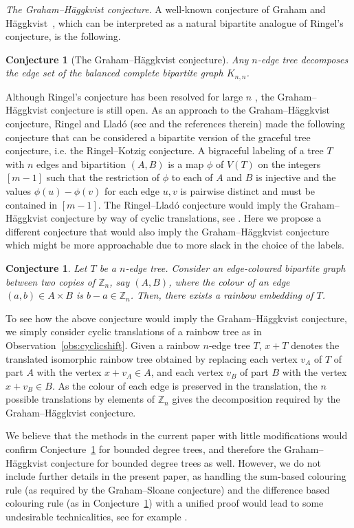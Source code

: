 \documentclass[a4paper,11pt,hidelinks]{amsart}
\newtheorem{conjecture}[theorem]{Conjecture}
\theoremstyle{definition}
\begin{document}
\par \textit{The Graham--H\"aggkvist conjecture}. A well-known conjecture of Graham and H\"aggkvist~\cite{Häggkvist_1989}, which can be interpreted as a natural bipartite analogue of Ringel's conjecture, is the following.
\begin{conjecture}[The Graham--H\"aggkvist conjecture]
    Any $n$-edge tree decomposes the edge set of the balanced complete bipartite graph $K_{n,n}$.
\end{conjecture}
Although Ringel's conjecture has been resolved for large $n$ \cite{ringel, keevash2025ringel}, the Graham--H\"aggkvist conjecture is still open. As an approach to the Graham--H\"aggkvist conjecture, Ringel and Llad\'o (see \cite{camara2009conjecture} and the references therein) made the following conjecture that can be considered a bipartite version of the graceful tree conjecture, i.e. the Ringel--Kotzig conjecture. A bigraceful labeling of a tree $T$ with $n$ edges and bipartition $(A,B)$
is a map $\phi$ of $V(T)$ on the integers $[m-1]$ such that the restriction of $\phi$ to each of $A$ and $B$ is injective and the values $\phi(u)-\phi(v)$ for each edge $u,v$ is pairwise distinct and must be contained in $[m-1]$. The Ringel--Llad\'o conjecture would imply the Graham--H\"aggkvist conjecture by way of cyclic translations, see \cite{camara2009conjecture}. Here we propose a different conjecture that would also imply the Graham--H\"aggkvist conjecture which might be more approachable due to more slack in the choice of the labels.
\begin{conjecture}\label{anotherrainbowconjecture} Let $T$ be a $n$-edge tree. Consider an edge-coloured bipartite graph between two copies of $\mathbb{Z}_n$, say $(A,B)$, where the colour of an edge $(a,b)\in A\times B$ is $b-a\in \mathbb{Z}_n$. Then, there exists a rainbow embedding of $T$.
\end{conjecture}
To see how the above conjecture would imply the Graham--H\"aggkvist conjecture, we simply consider cyclic translations of a rainbow tree as in Observation~\ref{obs:cyclicshift}. Given a rainbow $n$-edge tree $T$, $x+T$ denotes the translated isomorphic rainbow tree obtained by replacing each vertex $v_A$ of $T$ of part $A$ with the vertex $x+v_A\in A$, and each vertex $v_B$ of part $B$ with the vertex $x+v_B\in B$. As the colour of each edge is preserved in the translation, the $n$ possible translations by elements of $\mathbb{Z}_n$ gives the decomposition required by the Graham--H\"aggkvist conjecture. 
\par We believe that the methods in the current paper with little modifications would confirm Conjecture~\ref{anotherrainbowconjecture} for bounded degree trees, and therefore the Graham--H\"aggkvist conjecture for bounded degree trees as well. However, we do not include further details in the present paper, as handling the sum-based colouring rule (as required by the Graham--Sloane conjecture) and the difference based colouring rule (as in Conjecture~\ref{anotherrainbowconjecture}) with a unified proof would lead to some undesirable technicalities, see for example \cite[Section 4]{muyesser2022random}. 
\end{document}
